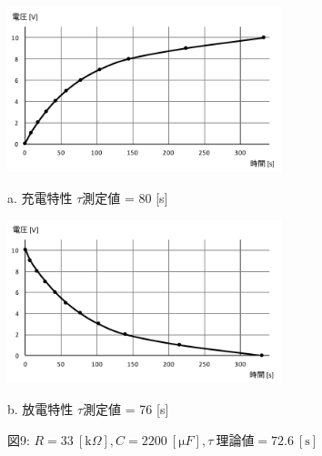 \documentclass[uplatex]{jsarticle}
\begin{document}
			\begin{figure}[!h]
				\begin{minipage}{0.5\hsize}
					\begin{center}
						\includegraphics[width = 8cm]{9-a.pdf}
					\end{center}
					\captionsetup{labelformat=empty,labelsep=none}
					\caption{a. 充電特性 $\tau$測定値 = 80 [s]}
				\end{minipage}
				\begin{minipage}{0.5\hsize}
					\begin{center}
						\includegraphics[width = 8cm]{9-b.pdf}
					\end{center}
					\captionsetup{labelformat=empty,labelsep=none}
					\caption{b. 放電特性 $\tau$測定値 = 76 [s]}
				\end{minipage}
				\captionsetup{labelformat=empty,labelsep=none}
				\caption{図9: $R = 33 \ [\mathrm k \Omega], C = 2200 \ [\mathrm \mu F], \tau \ 理論値 = 72.6 \ [\mathrm s]$}
			\end{figure}
\end{document}

